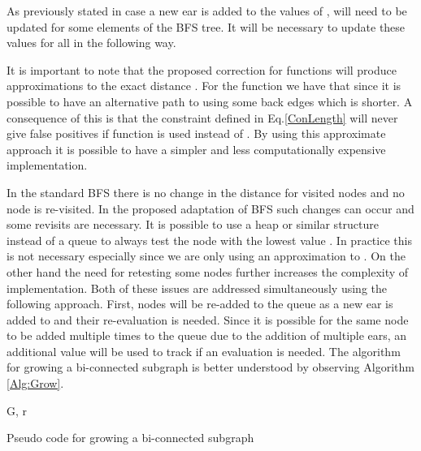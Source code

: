 As previously stated in case a new ear  is added to    the values of ,  will need to be updated for some elements of the BFS tree.  It will be necessary to update these values for all  in the following way.





It is important to note that the proposed correction for functions  will produce approximations to the exact 
distance . For the function  we have that   since it is possible to have an alternative path to  using some back edges which is shorter. A consequence of this is that the constraint defined in  Eq.\eqref{ConLength} will never give false positives if function  is used instead of . By using this approximate approach it is possible to have a simpler and less computationally expensive implementation. 

In the standard BFS there is no change in the distance for visited nodes and no node is re-visited. In the proposed adaptation of BFS such changes can occur and some revisits are necessary. It is possible to use a heap or similar structure instead of a queue to always test the node  with the lowest value . In practice this is not necessary especially since we are only using an approximation to . On the other hand the need for retesting some nodes further increases the complexity of implementation. Both of these issues are addressed simultaneously using the following approach. First, nodes will be re-added to the queue as a new ear is added to  and their re-evaluation is needed. Since it is possible for the same node to be added multiple times to the queue due to the addition of multiple ears, an additional value will be used to track if an evaluation is needed. The algorithm for growing a bi-connected subgraph is better understood by observing Algorithm \ref{Alg:Grow}.
\begin{algorithm}
\begin{algorithmic}
 {G, r}

 \State{} 
 \If{}
 \ForAll{}
 		\State{} 
	 	\State{} 
 	\EndIf
 \Else
 	\State{} 
	\State{ } 
 \EndIf
 \EndFor
  \State{}
  \EndIf
\EndWhile
\EndProcedure
\end{algorithmic}
\caption{\label{Alg:Grow} Pseudo code for growing a bi-connected subgraph}
\end{algorithm}



